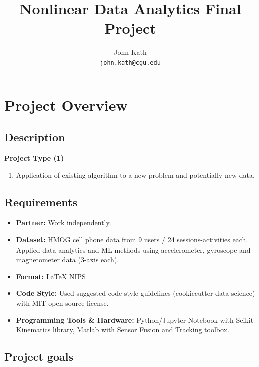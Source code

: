 \documentclass{article}
\title{Nonlinear Data Analytics Final Project}
\author{
  John Kath \\
  \texttt{john.kath@cgu.edu} \\
}
\begin{document}
\maketitle

\tableofcontents


\section{Project Overview}

\subsection{Description}

\textbf{Project Type (1)}

\begin{enumerate}
  \item Application of existing algorithm to a new problem and
    potentially new data.
\end{enumerate}

\subsection{Requirements}

\begin{itemize}
  \item \textbf{Partner:} Work independently.
  \item \textbf{Dataset:} HMOG cell phone data from 9 
    users / 24 sessions-activities each. Applied data analytics and ML methods using
    accelerometer, gyroscope and magnetometer data (3-axis each).
  \item \textbf{Format:} \LaTeX{} NIPS
  \item \textbf{Code Style:} Used suggested code style guidelines
    (cookiecutter data science) with MIT open-source license.
  \item \textbf{Programming Tools \& Hardware:} Python/Jupyter
    Notebook with Scikit Kinematics library, Matlab with Sensor Fusion and Tracking toolbox.
\end{itemize}

\subsection{Project goals}
\end{document}
